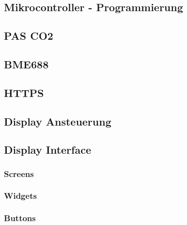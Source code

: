 \begin{inhalt}
\renewcommand*\chapterpagestyle{scrheadings}
\chapter{Mikrocontroller - Programmierung}

\section{PAS CO2}
\section{BME688}

\section{HTTPS}

\section{Display Ansteuerung}

\section{Display Interface}
\subsection{Screens}
\subsection{Widgets}
\subsection{Buttons}



\end{inhalt}